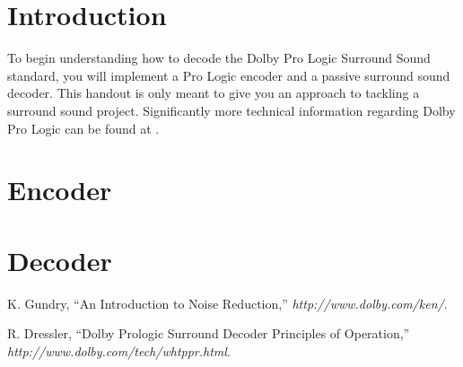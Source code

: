 \documentclass[11pt]{handout}
\begin{document}
\setlength{\baselineskip}{0.5cm}
\setlength{\parskip}{0.5cm}

\makeboxtitle
\vspace{0.3cm}

\section{Introduction}
To begin understanding how to decode the Dolby Pro Logic Surround Sound 
standard, you will implement a Pro Logic encoder and a passive surround 
sound decoder.  This handout is only meant to give you an approach to 
tackling a surround sound project.  Significantly more technical 
information regarding Dolby Pro Logic can be found at \cite{Dressler}.

\section{Encoder}



\section{Decoder}



\small
\ifx\undefined\allcaps{}\fi
\begin{thebibliography}{2}

K. Gundry, ``An Introduction to Noise Reduction,''
{\em http://www.dolby.com/ken/}.

R. Dressler, ``Dolby Prologic Surround Decoder Principles of Operation,''
{\em http://www.dolby.com/tech/whtppr.html}.

\end{thebibliography}
\end{document}
